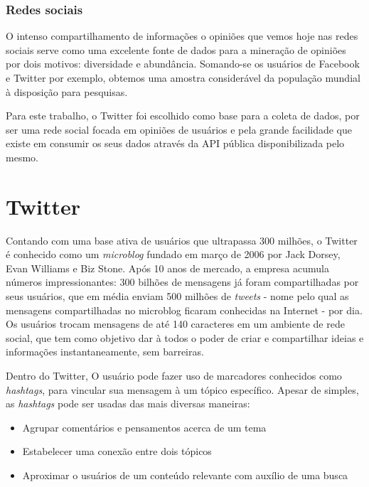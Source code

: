 \subsubsection{Redes sociais}

O intenso compartilhamento de informações o opiniões que vemos hoje nas redes sociais serve como uma excelente fonte de dados para a mineração de opiniões por dois motivos: diversidade e abundância. Somando-se os usuários de Facebook e Twitter por exemplo, obtemos uma amostra considerável da população mundial à disposição para pesquisas.

Para este trabalho, o Twitter foi escolhido como base para a coleta de dados, por ser uma rede social focada em opiniões de usuários e pela grande facilidade que existe em consumir os seus dados através da API pública disponibilizada pelo mesmo.

\section{Twitter}\label{sec:twitter}

Contando com uma base ativa de usuários que ultrapassa 300 milhões\cite{twittercompany2016}, o Twitter é conhecido como um \emph{microblog} fundado em março de 2006 por Jack Dorsey, Evan Williams e Biz Stone. Após 10 anos de mercado, a empresa acumula números impressionantes: 300 bilhões de mensagens já foram compartilhadas por seus usuários, que em média enviam 500 milhões de \emph{tweets}\cite{twitterstats2016} - nome pelo qual as mensagens compartilhadas no microblog ficaram conhecidas na Internet - por dia. Os usuários trocam mensagens de até 140 caracteres\cite{twittercharlimit2016} em um ambiente de rede social, que tem como objetivo dar à todos o poder de criar e compartilhar ideias e informações instantaneamente, sem barreiras\cite{twittercompany2016}. 

Dentro do Twitter, O usuário pode fazer uso de marcadores conhecidos como \emph{hashtags}\cite{waite2012paperback}, para vincular sua mensagem à um tópico específico. Apesar de simples, as \emph{hashtags} pode ser usadas das mais diversas maneiras:
\begin{itemize}
\item Agrupar comentários e pensamentos acerca de um tema
\item Estabelecer uma conexão entre dois tópicos
\item Aproximar o usuários de um conteúdo relevante com auxílio de uma busca
\end{itemize}

